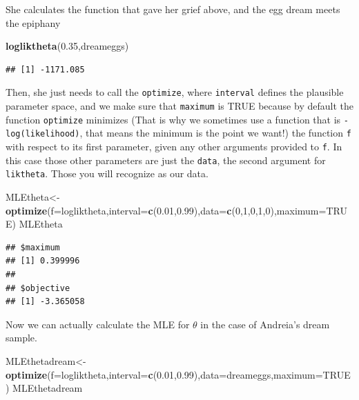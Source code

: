 \documentclass[
]{book}
\newenvironment{Shaded}{\begin{snugshade}}{\end{snugshade}}
\newcommand{\AttributeTok}[1]{\textcolor[rgb]{0.13,0.29,0.53}{#1}}
\newcommand{\ConstantTok}[1]{\textcolor[rgb]{0.56,0.35,0.01}{#1}}
\newcommand{\DecValTok}[1]{\textcolor[rgb]{0.00,0.00,0.81}{#1}}
\newcommand{\FloatTok}[1]{\textcolor[rgb]{0.00,0.00,0.81}{#1}}
\newcommand{\FunctionTok}[1]{\textcolor[rgb]{0.13,0.29,0.53}{\textbf{#1}}}
\newcommand{\NormalTok}[1]{#1}
\newcommand{\OtherTok}[1]{\textcolor[rgb]{0.56,0.35,0.01}{#1}}
\begin{document}
She calculates the function that gave her grief above, and the egg dream meets the epiphany

\begin{Shaded}
\begin{Highlighting}[]
\FunctionTok{logliktheta}\NormalTok{(}\FloatTok{0.35}\NormalTok{,dreameggs)}
\end{Highlighting}
\end{Shaded}

\begin{verbatim}
## [1] -1171.085
\end{verbatim}

Then, she just needs to call the \texttt{optimize}, where \texttt{interval} defines the plausible parameter space, and we make sure that \texttt{maximum} is TRUE because by default the function \texttt{optimize} minimizes (That is why we sometimes use a function that is \texttt{-log(likelihood)}, that means the minimum is the point we want!) the function \texttt{f} with respect to its first parameter, given any other arguments provided to \texttt{f}. In this case those other parameters are just the \texttt{data}, the second argument for \texttt{liktheta}. Those you will recognize as our data.

\begin{Shaded}
\begin{Highlighting}[]
\NormalTok{MLEtheta}\OtherTok{\textless{}{-}}\FunctionTok{optimize}\NormalTok{(}\AttributeTok{f=}\NormalTok{logliktheta,}\AttributeTok{interval=}\FunctionTok{c}\NormalTok{(}\FloatTok{0.01}\NormalTok{,}\FloatTok{0.99}\NormalTok{),}\AttributeTok{data=}\FunctionTok{c}\NormalTok{(}\DecValTok{0}\NormalTok{,}\DecValTok{1}\NormalTok{,}\DecValTok{0}\NormalTok{,}\DecValTok{1}\NormalTok{,}\DecValTok{0}\NormalTok{),}\AttributeTok{maximum=}\ConstantTok{TRUE}\NormalTok{)}
\NormalTok{MLEtheta}
\end{Highlighting}
\end{Shaded}

\begin{verbatim}
## $maximum
## [1] 0.399996
## 
## $objective
## [1] -3.365058
\end{verbatim}

Now we can actually calculate the MLE for \(\theta\) in the case of Andreia's dream sample.

\begin{Shaded}
\begin{Highlighting}[]
\NormalTok{MLEthetadream}\OtherTok{\textless{}{-}}\FunctionTok{optimize}\NormalTok{(}\AttributeTok{f=}\NormalTok{logliktheta,}\AttributeTok{interval=}\FunctionTok{c}\NormalTok{(}\FloatTok{0.01}\NormalTok{,}\FloatTok{0.99}\NormalTok{),}\AttributeTok{data=}\NormalTok{dreameggs,}\AttributeTok{maximum=}\ConstantTok{TRUE}\NormalTok{)}
\NormalTok{MLEthetadream}
\end{Highlighting}
\end{Shaded}
\end{document}
